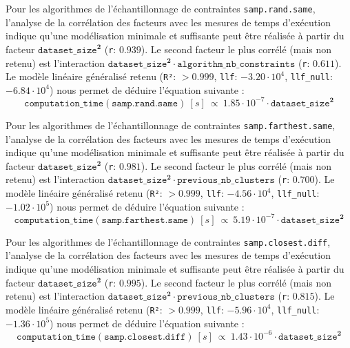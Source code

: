 			Pour les algorithmes de l'échantillonnage de contraintes \texttt{samp.rand.same}, l'analyse de la corrélation des facteurs avec les mesures de temps d'exécution indique qu'une modélisation minimale et suffisante peut être réalisée à partir du facteur $\texttt{dataset\_size}^{\textbf{2}}$ (\texttt{r}: $0.939$).
			Le second facteur le plus corrélé (mais non retenu) est l'interaction $\texttt{dataset\_size}^{\textbf{2}} \cdot \texttt{algorithm\_nb\_constraints}$ (\texttt{r}: $0.611$).
			Le modèle linéaire généralisé retenu (\texttt{R²}: $> 0.999$, \texttt{llf}: $-3.20 \cdot 10^{4}$, \texttt{llf\_null}: $-6.84 \cdot 10^{4}$) nous permet de déduire l'équation suivante :
			\begin{equation}
				\texttt{computation\_time}(\texttt{samp.rand.same})~[s]~
				\propto~1.85 \cdot 10^{-7} \cdot \texttt{dataset\_size}^{\textbf{2}}
			\end{equation}
			
			Pour les algorithmes de l'échantillonnage de contraintes \texttt{samp.farthest.same}, l'analyse de la corrélation des facteurs avec les mesures de temps d'exécution indique qu'une modélisation minimale et suffisante peut être réalisée à partir du facteur $\texttt{dataset\_size}^{\textbf{2}}$ (\texttt{r}: $0.981$).
			Le second facteur le plus corrélé (mais non retenu) est l'interaction $\texttt{dataset\_size}^{\textbf{2}} \cdot \texttt{previous\_nb\_clusters}$ (\texttt{r}: $0.700$).
			Le modèle linéaire généralisé retenu (\texttt{R²}: $> 0.999$, \texttt{llf}: $-4.56 \cdot 10^{4}$, \texttt{llf\_null}: $-1.02 \cdot 10^{5}$) nous permet de déduire l'équation suivante :
			\begin{equation}
				\texttt{computation\_time}(\texttt{samp.farthest.same})~[s]~
				\propto~5.19 \cdot 10^{-7} \cdot \texttt{dataset\_size}^{\textbf{2}}
			\end{equation}
			
			Pour les algorithmes de l'échantillonnage de contraintes \texttt{samp.closest.diff}, l'analyse de la corrélation des facteurs avec les mesures de temps d'exécution indique qu'une modélisation minimale et suffisante peut être réalisée à partir du facteur $\texttt{dataset\_size}^{\textbf{2}}$ (\texttt{r}: $0.995$).
			Le second facteur le plus corrélé (mais non retenu) est l'interaction $\texttt{dataset\_size}^{\textbf{2}} \cdot \texttt{previous\_nb\_clusters}$ (\texttt{r}: $0.815$).
			Le modèle linéaire généralisé retenu (\texttt{R²}: $> 0.999$, \texttt{llf}: $-5.96 \cdot 10^{4}$, \texttt{llf\_null}: $-1.36 \cdot 10^{5}$) nous permet de déduire l'équation suivante :
			\begin{equation}
				\texttt{computation\_time}(\texttt{samp.closest.diff})~[s]~
				\propto~1.43 \cdot 10^{-6} \cdot \texttt{dataset\_size}^{\textbf{2}}
			\end{equation}
			
